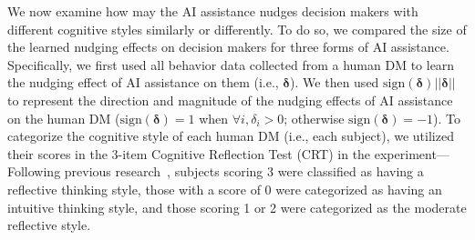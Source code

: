 \documentclass[letterpaper]{article} %
\begin{document}
We now examine how may the AI assistance nudges decision makers with different cognitive styles similarly or differently.  To do so, we compared the size of the learned nudging effects on decision makers for three forms of AI assistance. Specifically, we first used all behavior data collected from a human DM to learn the nudging effect of AI assistance on them (i.e., $\bm{\delta}$). 
We then used $\text{sign}(\bm{\delta})||\bm{\delta}||$ to represent the direction and magnitude of the nudging effects of AI assistance on the human DM ($\text{sign}(\bm{\delta})=1$ when $\forall i, \delta_i>0$; otherwise $\text{sign}(\bm{\delta})=-1$). 
To categorize the cognitive style of each human DM (i.e., each subject), we utilized 
their scores in the 3-item Cognitive Reflection Test (CRT) in the experiment---Following previous research~\cite{Frederick2005CognitiveRA}, subjects scoring 3 were classified as having a reflective thinking style, those with a score of 0 were categorized as having an intuitive thinking style, and those scoring 1 or 2 were categorized as the moderate reflective style.

\end{document}
